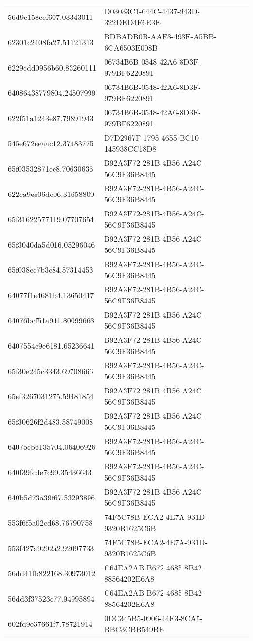 \begin{tabular}{ll}
56d9c158ccf607.03343011 & D03033C1-644C-4437-943D-322DED4F6E3E \\
62301c2408fa27.51121313 & BDBADB0B-AAF3-493F-A5BB-6CA6503E008B \\
6229cdd0956b60.83260111 & 06734B6B-0548-42A6-8D3F-979BF6220891 \\
64086438779804.24507999 & 06734B6B-0548-42A6-8D3F-979BF6220891 \\
622f51a1243e87.79891943 & 06734B6B-0548-42A6-8D3F-979BF6220891 \\
545e672eeaac12.37483775 & D7D2967F-1795-4655-BC10-145938CC18D8 \\
65f03532871ce8.70630636 & B92A3F72-281B-4B56-A24C-56C9F36B8445 \\
622ca9ee06dc06.31658809 & B92A3F72-281B-4B56-A24C-56C9F36B8445 \\
65f31622577119.07707654 & B92A3F72-281B-4B56-A24C-56C9F36B8445 \\
65f3040da5d016.05296046 & B92A3F72-281B-4B56-A24C-56C9F36B8445 \\
65f038ec7b3e84.57314453 & B92A3F72-281B-4B56-A24C-56C9F36B8445 \\
64077f1e4681b4.13650417 & B92A3F72-281B-4B56-A24C-56C9F36B8445 \\
64076bcf51a941.80099663 & B92A3F72-281B-4B56-A24C-56C9F36B8445 \\
6407554c9e6181.65236641 & B92A3F72-281B-4B56-A24C-56C9F36B8445 \\
65f30e245c3343.69708666 & B92A3F72-281B-4B56-A24C-56C9F36B8445 \\
65ef3267031275.59481854 & B92A3F72-281B-4B56-A24C-56C9F36B8445 \\
65f30626f2d483.58749008 & B92A3F72-281B-4B56-A24C-56C9F36B8445 \\
64075cb6135704.06406926 & B92A3F72-281B-4B56-A24C-56C9F36B8445 \\
640f39fcde7c99.35436643 & B92A3F72-281B-4B56-A24C-56C9F36B8445 \\
640b5d73a39f67.53293896 & B92A3F72-281B-4B56-A24C-56C9F36B8445 \\
553f6f5a02cd68.76790758 & 74F5C78B-ECA2-4E7A-931D-9320B1625C6B \\
553f427a9292a2.92097733 & 74F5C78B-ECA2-4E7A-931D-9320B1625C6B \\
56dd41fb822168.30973012 & C64EA2AB-B672-4685-8B42-88564202E6A8 \\
56dd3f37523c77.94995894 & C64EA2AB-B672-4685-8B42-88564202E6A8 \\
602fd9e37661f7.78721914 & 0DC345B5-0906-44F3-8CA5-BBC3CBB549BE \\

\end{tabular}

